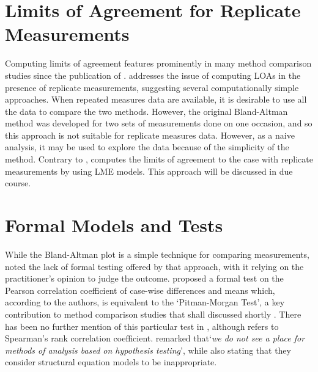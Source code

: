 \documentclass[12pt, a4paper]{report}
\theoremstyle{plain}
\theoremstyle{definition}
\theoremstyle{remark}
\begin{document}
\section{Limits of Agreement for Replicate Measurements}

Computing limits of agreement features prominently in many method comparison studies since the publication of \citet{BA86}.
\citet{BA99} addresses the issue of computing LOAs in the presence of replicate measurements, suggesting several computationally simple approaches. When repeated measures data are available, it is desirable to use
all the data to compare the two methods. However, the original Bland-Altman method was developed for two sets of measurements done on one occasion, and so this approach is not suitable for replicate measures data. However, as a naive analysis, it may be used to explore the data because of the simplicity of the method.
Contrary to \citet{BA99}, \citet{BXC2008} computes the limits of agreement to the case with replicate measurements by using LME models. This approach will be discussed in due course.




\section{Formal Models and Tests}
While the Bland-Altman plot is a simple technique for comparing measurements, \citet{Kinsella} noted the lack of formal testing offered by
that approach, with it relying on the practitioner's opinion to judge the outcome. \citet{BA83} proposed a formal test on the
Pearson correlation coefficient of case-wise differences and means which, according to the authors, is equivalent
to the `Pitman-Morgan Test', a key contribution to method comparison studies that shall discussed shortly \citep{morgan, pitman}. There has been no further mention of this particular test in
\citet{BA86}, although \citet{BA99} refers to Spearman's rank
correlation coefficient. \citet{BA99} remarked that`\textit{we do not see a
	place for methods of analysis based on hypothesis testing}', while also stating that they consider structural equation models to be inappropriate.

%
\end{document}
